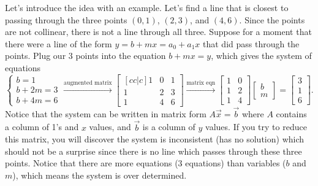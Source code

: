 Let's introduce the idea with an example. Let's find a line that is closest to passing through the three points $(0,1)$, $(2,3)$, and $(4,6)$.  Since the points are not collinear, there is not a line through all three.  Suppose for a moment that there were a line of the form $y=b+mx=a_0+a_1x$ that did pass through the points. Plug our 3 points into the equation $b+mx=y$, which gives the system of equations 
$$\begin{cases}b=1\\b+2m=3\\b+4m=6\end{cases}
\xrightarrow{\text{augmented matrix}}
\begin{bmatrix}[cc|c]1&0&1\\1&2&3\\1&4&6\end{bmatrix}
\xrightarrow{\text{matrix eqn}}
\begin{bmatrix}1&0\\1&2\\1&4\end{bmatrix}
\begin{bmatrix}b\\m\end{bmatrix}
=\begin{bmatrix}3\\1\\6\end{bmatrix}.
$$
Notice that the system can be written in matrix form $A\vec x = \vec b$ where $A$ contains a column of 1's and $x$ values, and $\vec b$ is a column of $y$ values. If you try to reduce this matrix, you will discover the system is inconsistent (has no solution) which should not be a surprise since there is no line which passes through these three points. Notice that there are more equations (3 equations) than variables ($b$ and $m$), which means the system is over determined. 

